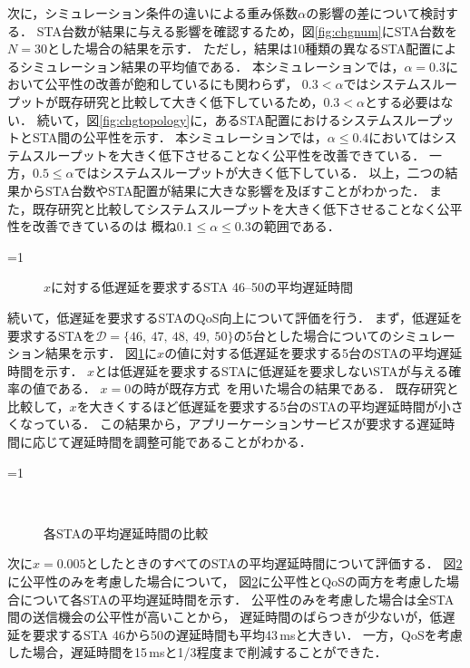 \documentclass[master]{kuisthesis}		%
\newcounter{flagFig}
\begin{document}
			次に，シミュレーション条件の違いによる重み係数$\alpha$の影響の差について検討する．
			STA台数が結果に与える影響を確認するため，図\ref{fig:chgnum}にSTA台数を$N=30$とした場合の結果を示す．
			ただし，結果は10種類の異なるSTA配置によるシミュレーション結果の平均値である．
			本シミュレーションでは，$\alpha=0.3$において公平性の改善が飽和しているにも関わらず，
			$0.3<\alpha$ではシステムスループットが既存研究と比較して大きく低下しているため，$0.3<\alpha$とする必要はない．
			続いて，図\ref{fig:chgtopology}に，あるSTA配置におけるシステムスループットとSTA間の公平性を示す．
			本シミュレーションでは，$\alpha\leq0.4$においてはシステムスループットを大きく低下させることなく公平性を改善できている．
			一方，$0.5\leq\alpha$ではシステムスループットが大きく低下している．
			以上，二つの結果からSTA台数やSTA配置が結果に大きな影響を及ぼすことがわかった．
			また，既存研究と比較してシステムスループットを大きく低下させることなく公平性を改善できているのは
			概ね$0.1\leq\alpha\leq0.3$の範囲である．

			\par
			\ifnum\value{flagFig}=1 {\begin{figure}[htbp]
				\centering
				\caption{$x$に対する低遅延を要求するSTA 46--50の平均遅延時間}
				\label{fig:chnx}
			\end{figure}}\fi
			続いて，低遅延を要求するSTAのQoS向上について評価を行う．
			まず，低遅延を要求するSTAを${\mathcal D}=\{46,\ 47,\ 48,\ 49,\ 50\}$の5台とした場合についてのシミュレーション結果を示す．
			図\ref{fig:chnx}に$x$の値に対する低遅延を要求する5台のSTAの平均遅延時間を示す．
			$x$とは低遅延を要求するSTAに低遅延を要求しないSTAが与える確率の値である．
			$x=0$の時が既存方式~\cite{promac}を用いた場合の結果である．
			既存研究と比較して，$x$を大きくするほど低遅延を要求する5台のSTAの平均遅延時間が小さくなっている．
			この結果から，アプリーケーションサービスが要求する遅延時間に応じて遅延時間を調整可能であることがわかる．
			\par
			\ifnum\value{flagFig}=1 {\begin{figure}[htbp]
				\centering
				\\
				\caption{各STAの平均遅延時間の比較}
				\label{fig:inter}
			\end{figure}}\fi
			次に$x=0.005$としたときのすべてのSTAの平均遅延時間について評価する．
			図\ref{fig:inter}に公平性のみを考慮した場合について，
			図\ref{fig:inter}に公平性とQoSの両方を考慮した場合について各STAの平均遅延時間を示す．
			公平性のみを考慮した場合は全STA間の送信機会の公平性が高いことから，
			遅延時間のばらつきが少ないが，低遅延を要求するSTA 46から50の遅延時間も平均43\,msと大きい．
			一方，QoSを考慮した場合，遅延時間を15\,msと1/3程度まで削減することができた．
\end{document}
